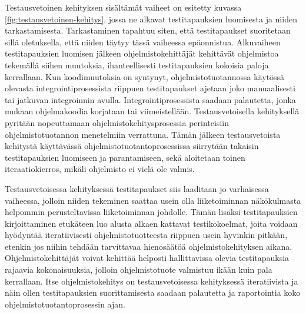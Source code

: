   Testausvetoinen kehityksen sisältämät vaiheet on esitetty kuvassa \ref{fig:testausvetoinen-kehitys}, jossa ne alkavat testitapauksien luomisesta ja niiden tarkastamisesta.
  Tarkastaminen tapahtuu siten, että testitapaukset suoritetaan sillä oletuksella, että niiden täytyy tässä vaiheessa epäonnistua.
  Alkuvaiheen testitapauksien luomisen jälkeen ohjelmistokehittäjät kehittävät ohjelmistoa tekemällä siihen muutoksia, ihanteellisesti testitapauksien kokoisia paloja kerrallaan.
  Kun koodimuutoksia on syntynyt, ohjelmistotuotannossa käytössä olevasta integrointiprosessista riippuen testitapaukset ajetaan joko manuaalisesti tai jatkuvan integroinnin avulla.
  Integrointiprosessista saadaan palautetta, jonka mukaan ohjelmakoodia korjataan tai viimeistellään.
  Testausvetoisella kehityksellä pyritään nopeuttamaan ohjelmistokehitysprosessia perinteisiin ohjelmistotuotannon menetelmiin verrattuna.
  Tämän jälkeen testausvetoista kehitystä käyttävässä ohjelmistotuotantoprosessissa siirrytään takaisin testitapauksien luomiseen ja parantamiseen, sekä aloitetaan toinen iteraatiokierros, mikäli ohjelmisto ei vielä ole valmis. \cite{tdd_paper}

  Testausvetoisessa kehityksessä testitapaukset siis laaditaan jo varhaisessa vaiheessa, jolloin niiden tekeminen saattaa usein olla liiketoiminnan näkökulmasta helpommin perusteltavissa liiketoiminnan johdolle.
  Tämän lisäksi testitapauksien kirjoittaminen etukäteen luo alusta alkaen kattavat testikokoelmat, joita voidaan hyödyntää iteratiivisesti ohjelmistotuotteesta riippuen usein hyvinkin pitkään, etenkin jos niihin tehdään tarvittavaa hienosäätöä ohjelmistokehityksen aikana.
  Ohjelmistokehittäjät voivat kehittää helposti hallittavissa olevia testitapauksia rajaavia kokonaisuuksia, jolloin ohjelmistotuote valmistuu ikään kuin pala kerrallaan.
  Itse ohjelmistokehitys on testausvetoisessa kehityksessä iteratiivista ja näin ollen testitapauksien suorittamisesta saadaan palautetta ja raportointia koko ohjelmistotuotantoprosessin ajan.

